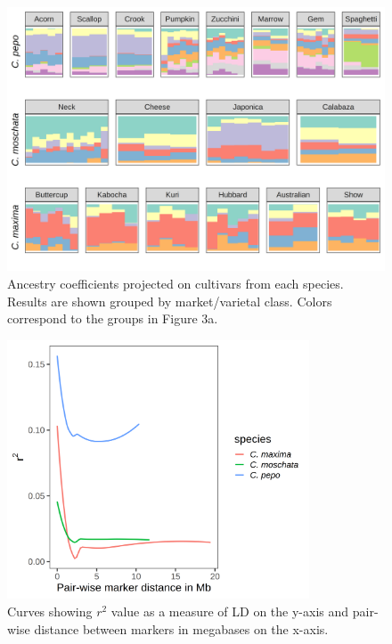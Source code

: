\documentclass[utf8]{FrontiersinHarvard} %
\begin{document}
\clearpage

\begin{figure}[h]
	\begin{center}
		\includegraphics[width=\textwidth]{../final_figures/05_fig.png}
	\end{center}
	\caption{Ancestry coefficients projected on cultivars from each species. Results are shown grouped by market/varietal class. Colors correspond to the groups in Figure 3a. \label{fig:5}}
\end{figure}

\clearpage

\begin{figure}[h]
	\begin{center}
		\includegraphics[width=0.8\textwidth]{../final_figures/06_fig.png}
	\end{center}
	\caption{Curves showing $r^{2}$ value as a measure of LD on the y-axis and pair-wise distance between markers in megabases on the x-axis. \label{fig:6}}
\end{figure}
\end{document}
